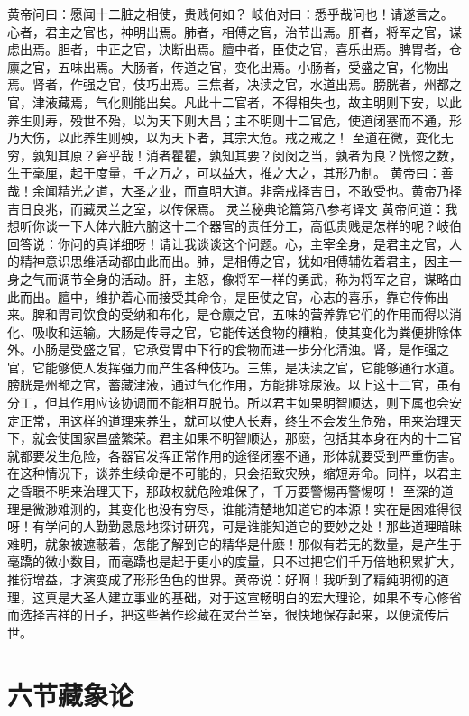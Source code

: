 \documentclass[a4paper,12pt,UTF8,twoside]{ctexbook}
\begin{document}
黄帝问曰：愿闻十二脏之相使，贵贱何如？
岐伯对曰：悉乎哉问也！请遂言之。心者，君主之官也，神明出焉。肺者，相傅之官，治节出焉。肝者，将军之官，谋虑出焉。胆者，中正之官，决断出焉。膻中者，臣使之官，喜乐出焉。脾胃者，仓廪之官，五味出焉。大肠者，传道之官，变化出焉。小肠者，受盛之官，化物出焉。肾者，作强之官，伎巧出焉。三焦者，决渎之官，水道出焉。膀胱者，州都之官，津液藏焉，气化则能出矣。凡此十二官者，不得相失也，故主明则下安，以此养生则寿，殁世不殆，以为天下则大昌；主不明则十二官危，使道闭塞而不通，形乃大伤，以此养生则殃，以为天下者，其宗大危。戒之戒之！
至道在微，变化无穷，孰知其原？窘乎哉！消者瞿瞿，孰知其要？闵闵之当，孰者为良？恍惚之数，生于毫厘，起于度量，千之万之，可以益大，推之大之，其形乃制。
黄帝曰：善哉！余闻精光之道，大圣之业，而宣明大道。非斋戒择吉日，不敢受也。黄帝乃择吉日良兆，而藏灵兰之室，以传保焉。
灵兰秘典论篇第八参考译文
黄帝问道：我想听你谈一下人体六脏六腑这十二个器官的责任分工，高低贵贱是怎样的呢？岐伯回答说：你问的真详细呀！请让我谈谈这个问题。心，主宰全身，是君主之官，人的精神意识思维活动都由此而出。肺，是相傅之官，犹如相傅辅佐着君主，因主一身之气而调节全身的活动。肝，主怒，像将军一样的勇武，称为将军之官，谋略由此而出。膻中，维护着心而接受其命令，是臣使之官，心志的喜乐，靠它传佈出来。脾和胃司饮食的受纳和布化，是仓廪之官，五味的营养靠它们的作用而得以消化、吸收和运输。大肠是传导之官，它能传送食物的糟粕，使其变化为粪便排除体外。小肠是受盛之官，它承受胃中下行的食物而进一步分化清浊。肾，是作强之官，它能够使人发挥强力而产生各种伎巧。三焦，是决渎之官，它能够通行水道。膀胱是州都之官，蓄藏津液，通过气化作用，方能排除尿液。以上这十二官，虽有分工，但其作用应该协调而不能相互脱节。所以君主如果明智顺达，则下属也会安定正常，用这样的道理来养生，就可以使人长寿，终生不会发生危殆，用来治理天下，就会使国家昌盛繁荣。君主如果不明智顺达，那麽，包括其本身在内的十二官就都要发生危险，各器官发挥正常作用的途径闭塞不通，形体就要受到严重伤害。在这种情况下，谈养生续命是不可能的，只会招致灾殃，缩短寿命。同样，以君主之昏聩不明来治理天下，那政权就危险难保了，千万要警惕再警惕呀！
至深的道理是微渺难测的，其变化也没有穷尽，谁能清楚地知道它的本源！实在是困难得很呀！有学问的人勤勤恳恳地探讨研究，可是谁能知道它的要妙之处！那些道理暗昧难明，就象被遮蔽着，怎能了解到它的精华是什麽！那似有若无的数量，是产生于毫蹻的微小数目，而毫蹻也是起于更小的度量，只不过把它们千万倍地积累扩大，推衍增益，才演变成了形形色色的世界。黄帝说：好啊！我听到了精纯明彻的道理，这真是大圣人建立事业的基础，对于这宣畅明白的宏大理论，如果不专心修省而选择吉祥的日子，把这些著作珍藏在灵台兰室，很快地保存起来，以便流传后世。

\chapter{六节藏象论}
\end{document}
